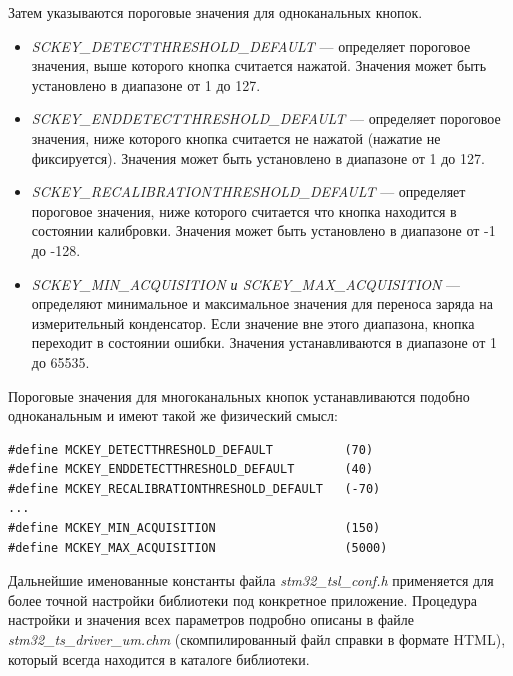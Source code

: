 Затем указываются пороговые значения для одноканальных кнопок.
\begin{itemize}
\item \textit{SCKEY\_DETECTTHRESHOLD\_DEFAULT} --- определяет пороговое значения, выше которого кнопка считается нажатой. Значения может быть установлено в диапазоне от 1 до 127.
\item \textit{SCKEY\_ENDDETECTTHRESHOLD\_DEFAULT} --- определяет пороговое значения, ниже которого кнопка считается не нажатой (нажатие не фиксируется). Значения может быть установлено в диапазоне от 1 до 127.
\item \textit{SCKEY\_RECALIBRATIONTHRESHOLD\_DEFAULT} --- определяет пороговое значения, ниже которого считается что кнопка находится в состоянии калибровки. Значения может быть установлено в диапазоне от -1 до -128.
\item \textit{SCKEY\_MIN\_ACQUISITION и SCKEY\_MAX\_ACQUISITION} --- определяют минимальное и максимальное значения для переноса заряда на измерительный конденсатор. Если значение вне этого диапазона, кнопка переходит в состоянии ошибки. Значения устанавливаются в диапазоне от 1 до 65535.
\end{itemize}
Пороговые значения для многоканальных кнопок устанавливаются подобно одноканальным и имеют такой же физический смысл:
\begin{verbatim}
#define MCKEY_DETECTTHRESHOLD_DEFAULT          (70)
#define MCKEY_ENDDETECTTHRESHOLD_DEFAULT       (40) 
#define MCKEY_RECALIBRATIONTHRESHOLD_DEFAULT   (-70)
...
#define MCKEY_MIN_ACQUISITION                  (150)
#define MCKEY_MAX_ACQUISITION                  (5000)
\end{verbatim}
Дальнейшие именованные константы файла \textit{stm32\_tsl\_conf.h} применяется для более точной настройки библиотеки под конкретное приложение. Процедура настройки и значения всех параметров подробно описаны в файле \textit{stm32\_ts\_driver\_um.chm} (скомпилированный файл справки в формате HTML), который всегда находится в каталоге библиотеки.

